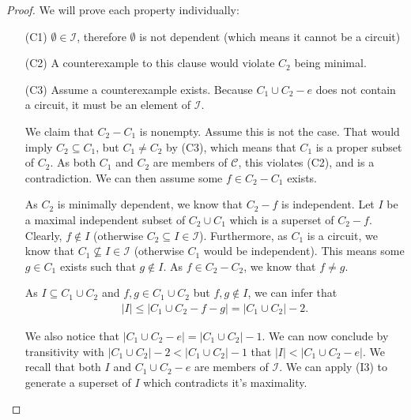 \begin{proof} We will prove each property individually:
  
\begin{enumerate}
    \item[(C1)] $\emptyset \in \mathcal I$, therefore $\emptyset$ is not dependent (which means it cannot be a circuit)
    \item[(C2)] A counterexample to this clause would violate $C _2$ being minimal.
    \item[(C3)] Assume a counterexample exists. Because $C _1 \cup C _2 - e$ does not contain a circuit, it must be an element of $\mathcal I$. 

        We claim that $C _2 - C _1$ is nonempty. Assume this is not the case. That would imply $C _2 \subseteq C _1$, but $C _1 \neq C _2 $ by (C3), which means that $C _1 $ is a proper subset of $C _2$. As both $C _1 $ and $C _2 $ are members of $\mathcal C$, this violates (C2), and is a contradiction. We can then assume some $f \in C _2 - C _1 $ exists.

        As $C _2$ is minimally dependent, we know that $C _2 - f$ is independent. Let $I$ be a maximal independent subset of $C _2 \cup C _1$ which is a superset of $C _2 - f$. Clearly, $f \not\in I$ (otherwise $C _2 \subseteq I \in \mathcal I$). Furthermore, as $C _1 $ is a circuit, we know that $C _1 \not \subseteq I \in \mathcal I$ (otherwise $C _1$ would be independent). This means some $g \in C _1$ exists such that $g \not\in I$. As $f \in C _2  -  C _2$, we know that $f \neq g$.

        As $I \subseteq C _1 \cup C _2$ and $f, g \in C _1 \cup C _2$ but $f, g \not\in I$, we can infer that 
        \begin{align*}
        |I| \leq |C _1 \cup C _2 - f - g| = |C _1 \cup C _2| - 2.
        \end{align*}

        We also notice that $|C _1 \cup C _2 - e| = |C _1 \cup C _2 | - 1$. We can now conclude by transitivity with $|C _1 \cup C _2 | - 2 < |C _1 \cup C _2 | - 1$ that $|I| < |C _1 \cup C _2 - e|$. We recall that both $I$ and $C _1 \cup C _2 - e$ are members of $\mathcal I$. We can apply (I3) to generate a superset of $I$ which contradicts it's maximality.
\end{enumerate}
\end{proof}

